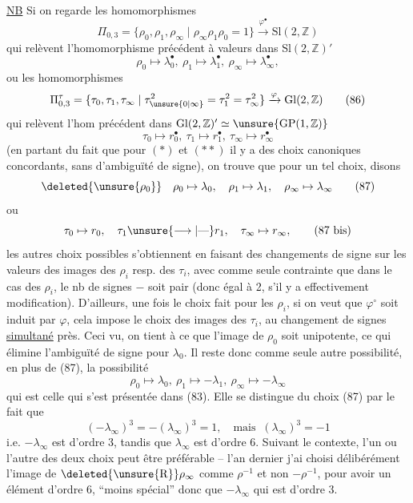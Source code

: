 \uline{NB} Si on regarde les homomorphismes
\[
\Pi_{0,3}=\{\rho_0,\rho_1,\rho_\infty\mid\rho_\infty\rho_1\rho_0=1\}\xrightarrow{\varphi^\bullet}\mathrm{Sl}(2,\mathbb Z)\tag*{(85)}
\]
qui relèvent l'homomorphisme précédent à valeurs dans $\mathrm{Sl}(2,\mathbb Z)'$
\[
\rho_0\mapsto\lambda_0^\bullet,\ \rho_1\mapsto\lambda_1^\bullet,\ \rho_\infty\mapsto\lambda_\infty^\bullet,\tag*{(*)}
\]
ou les homomorphismes
\[
\Pi_{0,3}^{\tau}=\{\tau_0,\tau_1,\tau_\infty\mid\tau_{\unsure{0|\infty}}^2=\tau_1^2=\tau_\infty^2\}\xrightarrow{\varphi}\mathrm{Gl}(2,\mathbb Z)\tag*{(86)}
\]
qui relèvent l'hom précédent dans $\mathrm{Gl}(2,\mathbb Z)'\simeq\unsure{\mathrm{GP}(1,\mathbb Z)}$
\[
\tau_0\mapsto r_0^\bullet,\ \tau_1\mapsto r_1^\bullet,\ \tau_\infty\mapsto r_\infty^\bullet\tag*{(**)}
\]
(en partant du fait que pour $(*)$ et $(**)$ il y a des choix canoniques concordants, sans 
d'ambiguïté de signe), on trouve que pour un tel choix, disons
\[
\deleted{\unsure{\rho_0}}\quad\rho_0\mapsto\lambda_0,\quad\rho_1\mapsto\lambda_1,\quad\rho_\infty\mapsto\lambda_\infty\tag*{(87)}
\]
ou
\[
\tau_0\mapsto r_0,\quad\tau_1\unsure{\longrightarrow|\text{---}}r_1,\quad\tau_\infty\mapsto r_\infty,\tag*{(87 bis)}
\]
les autres choix possibles s'obtiennent en faisant des changements de signe sur les valeurs des images des $\rho_i$ resp. des $\tau_i$, avec comme seule contrainte que dans le cas des $\rho_i$, le nb de signes $-$ soit pair (donc égal à 2, s'il y a effectivement modification). D'ailleurs, une fois le choix fait pour les $\rho_i$, si on veut que $\varphi^\circ$ soit induit par $\varphi$, cela impose le choix des images des $\tau_i$, au changement de signes \uline{simultané} près. Ceci vu, on tient à ce que l'image de $\rho_0$ soit  unipotente, ce qui élimine l'ambiguïté de signe pour $\lambda_0$.  Il reste donc comme seule autre possibilité, en plus de (87), la possibilité
\[
\rho_0\mapsto\lambda_0,\ \rho_1\mapsto-\lambda_1,\ \rho_\infty\mapsto-\lambda_\infty\tag*{(88)}
\]
qui est celle qui s'est présentée dans (83). Elle se distingue du choix (87) par le fait que
\[
(-\lambda_\infty)^3=-(\lambda_\infty)^3=1,\quad\text{mais }\ (\lambda_\infty)^3=-1
\]
i.e. $-\lambda_\infty$ est d'ordre 3, tandis que $\lambda_\infty$ est d'ordre 6. Suivant le contexte, l'un ou l'autre des deux choix
peut être préférable -- l'an dernier j'ai choisi délibérément l'image de $\deleted{\unsure{\mathrm R}}\rho_\infty$ comme \inserted{$\lambda_\infty=$} $\rho^{-1}$ et non $-\rho^{-1}$, pour avoir un élément d'ordre 6, ``moins spécial'' donc que $-\lambda_\infty$ qui est d'ordre 3.

